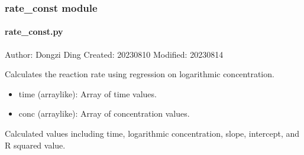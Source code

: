 \documentclass[a4paper,10pt,english]{sphinxmanual}
\begin{document}
\subsubsection{rate\_const module}
\label{\detokenize{utils:module-src.utils.rate_const}}\label{\detokenize{utils:rate-const-module}}

\paragraph{rate\_const.py}
\label{\detokenize{utils:rate-const-py}}
\sphinxAtStartPar
Author: Dongzi Ding
Created: 2023\sphinxhyphen{}08\sphinxhyphen{}10
Modified: 2023\sphinxhyphen{}08\sphinxhyphen{}14

\begin{fulllineitems}
\label{\detokenize{utils:src.utils.rate_const.calculate_rate}}
\pysigstartsignatures
{}
\pysigstopsignatures
\sphinxAtStartPar
Calculates the reaction rate using regression on logarithmic concentration.
\begin{description}
\begin{itemize}
\item {} 
\sphinxAtStartPar
time (array\sphinxhyphen{}like): Array of time values.

\item {} 
\sphinxAtStartPar
conc (array\sphinxhyphen{}like): Array of concentration values.

\end{itemize}

\sphinxAtStartPar
Calculated values including time, logarithmic concentration, slope, intercept, and R squared value.

\end{description}

\end{fulllineitems}

\end{document}
